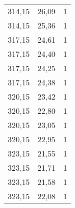 \begin{table}
\begin{tabular}{c c c}
    314,15 & 26,09 & 1 \\
    314,15 & 25,36 & 1 \\
    317,15 & 24,61 & 1 \\
    317,15 & 24,40 & 1 \\
    317,15 & 24,25 & 1 \\
    317,15 & 24,38 & 1 \\
    320,15 & 23,42 & 1 \\
    320,15 & 22,80 & 1 \\
    320,15 & 23,05 & 1 \\
    320,15 & 22,95 & 1 \\
    323,15 & 21,55 & 1 \\
    323,15 & 21,71 & 1 \\
    323,15 & 21,58 & 1 \\
    323,15 & 22,08 & 1 \\
    \bottomrule
  \end{tabular}
\end{table}